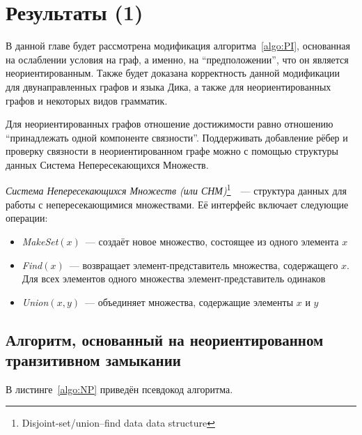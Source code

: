 \section{Результаты (1)}\label{section:bidirected}

В данной главе будет рассмотрена модификация алгоритма~\ref{algo:PI}, основанная на ослаблении условия на граф, а именно, на ``предположении'', что он является неориентированным. Также будет доказана корректность данной модификации для двунаправленных графов и языка Дика, а также для неориентированных графов и некоторых видов грамматик.

Для неориентированных графов отношение достижимости равно отношению ``принадлежать одной компоненте связности''. Поддерживать добавление рёбер и проверку связности в неориентированном графе можно с помощью структуры данных Система Непересекающихся Множеств. 

\begin{definition}
  \textit{Система Непересекающихся Множеств (или СНМ)}\footnote{Disjoint-set/union–find data data structure}~\cite{Galler1964}~--- структура данных для работы с непересекающимися множествами. Её интерфейс включает следующие операции:
  \vspace{-\topsep}
  \begin{itemize}
    \setlength\itemsep{-0.1em}
    \item \textit{MakeSet}$(x)$~--- создаёт новое множество, состоящее из одного элемента $x$
    \item \textit{Find}$(x)$~--- возвращает элемент-представитель множества, содержащего $x$. Для всех элементов одного множества элемент-представитель одинаков
    \item \textit{Union}$(x, y)$~--- объединяет множества, содержащие элементы $x$ и $y$
  \end{itemize}
\end{definition}

\subsection{Алгоритм, основанный на неориентированном транзитивном замыкании}

В листинге~\ref{algo:NP} приведён псевдокод алгоритма.

